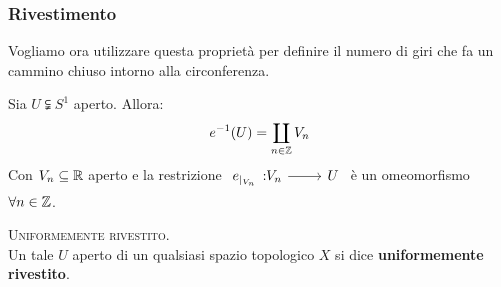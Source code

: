 \subsubsection{Rivestimento}
Vogliamo ora utilizzare questa proprietà per definire il numero di giri che fa un cammino chiuso intorno alla circonferenza.
\begin{lemming} \label{teo uniformemente rivestito}
	Sia $U\subsetneqq S^1$ aperto. Allora:
	\begin{equation}
		e^{-1}(U) = \coprod_{n\in\mathbb{Z}} V_n
	\end{equation}
Con $V_n\subseteq\mathbb{R}$ aperto e la restrizione $\funz {e_{\mid_{V_n}}} {V_n} U$ è un omeomorfismo $\forall n\in\mathbb{Z}$.
\end{lemming}
\begin{define} \textsc{Uniformemente rivestito.}\\
	Un tale $U$ aperto di un qualsiasi spazio topologico $X$ si dice \textbf{uniformemente rivestito}.
\end{define}
